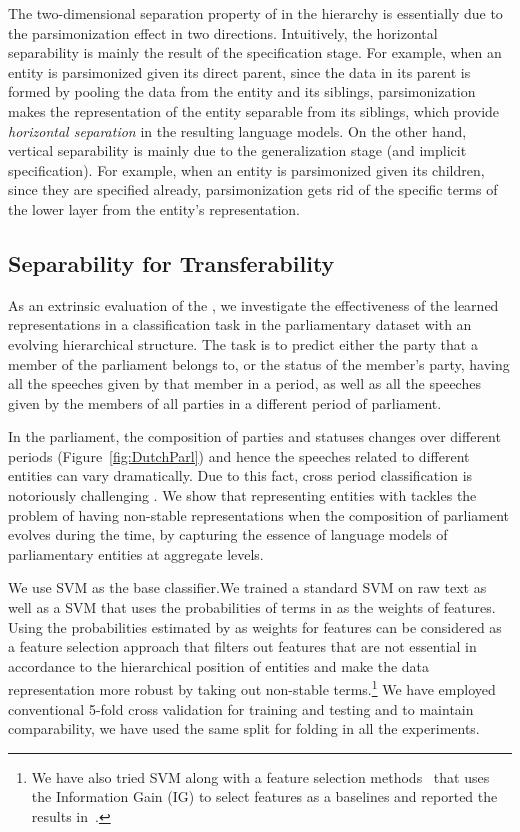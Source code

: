 The two-dimensional separation property of \achswlm in the hierarchy is essentially due to the parsimonization effect in two directions. 
Intuitively, the horizontal separability is mainly the result of the specification stage. For example, when an entity is parsimonized given its direct parent, since the data in its parent is formed by pooling the data from the entity and its siblings, parsimonization makes the representation of the entity separable from its siblings, which provide \emph{horizontal separation} in the resulting language models. On the other hand, vertical separability is mainly due to the generalization stage (and implicit specification). For example, when an entity is parsimonized given its children, since they are specified already, parsimonization gets rid of the specific terms of the lower layer from the entity's representation.


\subsection{Separability for Transferability}
\label{subsec:Separability}
As an extrinsic evaluation of the \hswlms, we investigate the effectiveness of the learned representations in a classification task in the parliamentary dataset with an evolving hierarchical structure. The task is to predict either the party that a member of the parliament belongs to, or the status of the member's party, having all the speeches given by that member in a period,  as well as all the speeches given by the members of all parties in a different period of parliament.

In the parliament, the composition of parties and statuses changes over different periods (Figure~\ref{fig:DutchParl}) and hence the speeches related to different entities can vary dramatically.  Due to this fact, cross period classification is notoriously challenging \citep{Hirst:2014,yu:2008}.  We show that representing entities with \achswlm tackles the problem of having non-stable representations when the composition of parliament evolves during the time, by capturing the essence of language models of parliamentary entities at aggregate levels. 

We use SVM as the base classifier.We trained a standard SVM on raw text as well as a SVM that uses the probabilities of terms in \achswlm as the weights of features. Using the probabilities estimated by \achswlm as weights for features can be considered as a feature selection approach that filters out features that are not essential in accordance to the hierarchical position of entities and make the data representation more robust by taking out non-stable terms.\footnote{We have also tried SVM along with a feature selection methods~\citep{Forman:2003,brank:2002} that uses the Information Gain (IG) to select features as a baselines and reported the results in~\citep{Dehghani:2016:ICTIR}.}
We have employed conventional 5-fold cross validation for training and testing and to maintain comparability, we have used the same split for folding in all the experiments.

